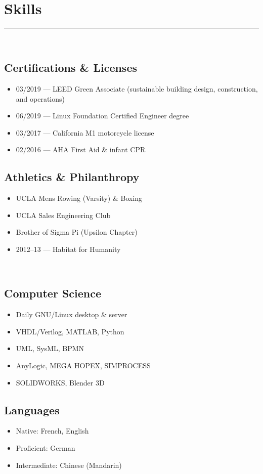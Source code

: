 \documentclass[10pt]{report}
\begin{document}
\section*{Skills}
\rule{\linewidth}{1pt}\\[0.2cm]
\begin{minipage}[t]{0.52\linewidth}
    \subsection*{Certifications \& Licenses}
    \begin{itemize}
        \item 03/2019 --- LEED Green Associate (sustainable building design, construction, and operations)
        \item 06/2019 --- Linux Foundation Certified Engineer degree
        \item 03/2017 --- California M1 motorcycle license
        \item 02/2016 --- AHA First Aid \& infant CPR
    \end{itemize}
    \subsection*{Athletics \& Philanthropy}
    \begin{itemize}
        \item UCLA Mens Rowing (Varsity) \& Boxing
        \item UCLA Sales Engineering Club
        \item Brother of Sigma Pi (Upsilon Chapter)
        \item 2012--13 --- Habitat for Humanity
    \end{itemize}
\end{minipage}
~
\begin{minipage}[t]{0.44\linewidth}
    \subsection*{Computer Science}
    \begin{itemize}
        \item Daily GNU/Linux desktop \& server
        \item VHDL/Verilog, MATLAB, Python
        \item UML, SysML, BPMN
        \item AnyLogic, MEGA HOPEX, SIMPROCESS
        \item SOLIDWORKS, Blender 3D
    \end{itemize}
    \subsection*{Languages}
    \begin{itemize}
        \item Native: French, English
        \item Proficient: German
        \item Intermediate: Chinese (Mandarin)
    \end{itemize}
\end{minipage}
\end{document}
